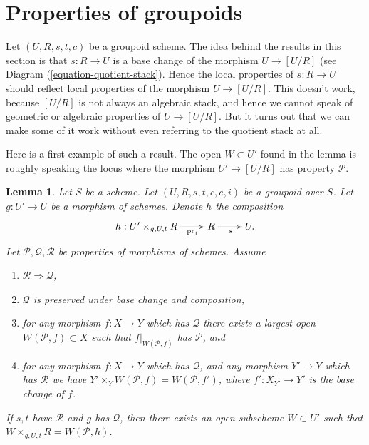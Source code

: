 \documentclass{stacks-project}
\theoremstyle{plain}
\newtheorem{lemma}[subsection]{Lemma}
\theoremstyle{definition}
\theoremstyle{remark}
\numberwithin{equation}{subsection}
\begin{document}
\section{Properties of groupoids}
\label{section-technical-lemma}

\noindent
Let $(U, R, s, t, c)$ be a groupoid scheme.
The idea behind the results in this section is that $s: R \to U$
is a base change of the morphism $U \to [U/R]$ (see
Diagram (\ref{equation-quotient-stack}).
Hence the local properties of $s : R \to U$ should reflect local
properties of the morphism $U \to [U/R]$.
This doesn't work, because $[U/R]$ is not always an algebraic stack, and
hence we cannot speak of geometric or algebraic properties of
$U \to [U/R]$.
But it turns out that we can make some of it work without even
referring to the quotient stack at all.

\medskip\noindent
Here is a first example of such a result. The open $W \subset U'$ found
in the lemma is roughly speaking the locus where the morphism
$U' \to [U/R]$ has property $\mathcal{P}$.

\begin{lemma}
\label{lemma-local-source}
Let $S$ be a scheme.
Let $(U, R, s, t, c, e, i)$ be a groupoid over $S$.
Let $g : U' \to U$ be a morphism of schemes.
Denote $h$ the composition
$$
\xymatrix{
h : U' \times_{g, U, t} R \ar[r]_-{\text{pr}_1} & R \ar[r]_s & U.
}
$$
Let $\mathcal{P}, \mathcal{Q}, \mathcal{R}$ be properties of morphisms
of schemes. Assume
\begin{enumerate}
\item $\mathcal{R} \Rightarrow \mathcal{Q}$,
\item $\mathcal{Q}$ is preserved under base change and composition,
\item for any morphism $f : X \to Y$ which has $\mathcal{Q}$ there exists a
largest open $W(\mathcal{P}, f) \subset X$ such that $f|_{W(\mathcal{P}, f)}$
has $\mathcal{P}$, and
\item for any morphism $f : X \to Y$ which has $\mathcal{Q}$,
and any morphism $Y' \to Y$ which has $\mathcal{R}$ we have
$Y' \times_Y W(\mathcal{P}, f) = W(\mathcal{P}, f')$, where
$f' : X_{Y'} \to Y'$ is the base change of $f$.
\end{enumerate}
If $s, t$ have $\mathcal{R}$ and $g$ has $\mathcal{Q}$, then
there exists an open subscheme $W \subset U'$ such that
$W \times_{g, U, t} R = W(\mathcal{P}, h)$.
\end{lemma}
\end{document}
